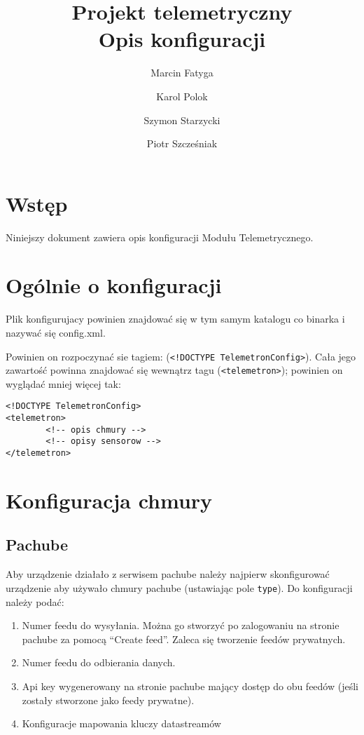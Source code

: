 \documentclass[11pt]{article}
\title{Projekt telemetryczny \\ Opis konfiguracji}
\author{Marcin Fatyga \and Karol Polok \and Szymon Starzycki \and Piotr Szcześniak}
\begin{document}
\begin{titlepage}

\maketitle

\thispagestyle{empty}
\end{titlepage}

\tableofcontents

\newpage

\section{Wstęp}
Niniejszy dokument zawiera opis konfiguracji Modułu Telemetrycznego.

\section{Ogólnie o konfiguracji}
Plik konfigurujacy powinien znajdować się w tym samym katalogu co binarka i nazywać się config.xml.

Powinien on rozpoczynać sie tagiem: (\verb|<!DOCTYPE TelemetronConfig>|). Cała jego zawartość powinna znajdować się wewnątrz tagu (\verb|<telemetron>|); powinien on wyglądać mniej więcej tak:
\begin{verbatim}
<!DOCTYPE TelemetronConfig>
<telemetron>
        <!-- opis chmury -->
        <!-- opisy sensorow -->
</telemetron>
\end{verbatim}


\section{Konfiguracja chmury}

\subsection{Pachube}

Aby urządzenie działało z serwisem pachube należy najpierw skonfigurować urządzenie aby używało chmury pachube (ustawiając pole \verb|type|).
Do konfiguracji należy podać:
\begin{enumerate}
\item Numer feedu do wysyłania. Można go stworzyć po zalogowaniu na stronie pachube za pomocą “Create feed”. Zaleca się tworzenie feedów prywatnych.
\item Numer feedu do odbierania danych.
\item Api key wygenerowany na stronie pachube mający dostęp do obu feedów (jeśli zostały stworzone jako feedy prywatne).
\item Konfiguracje mapowania kluczy datastreamów
\end{enumerate}
\end{document}
